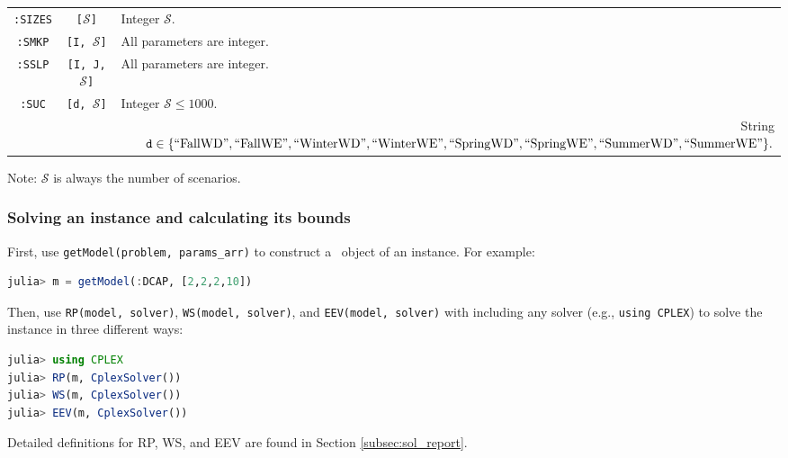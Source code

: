 \begin{table}[H]
{\begin{threeparttable}
\begin{tabular}{@{}ccl@{}}
				\texttt{:SIZES}              & \texttt{[$\mathcal{S}$]}          & Integer $\mathcal{S}$.                                                                                   \\
				\texttt{:SMKP}               & \texttt{[I, $\mathcal{S}$]}       & All parameters are integer.                                                                                                                \\
				\texttt{:SSLP}               & \texttt{[I, J, $\mathcal{S}$]}    & All parameters are integer.                                                                                                                \\
				\texttt{:SUC}                & \texttt{[d, $\mathcal{S}$]}       & \multicolumn{1}{l}{Integer $\mathcal{S}\le 1000$.}                                             \\
				\multicolumn{1}{l}{}         & \multicolumn{1}{l}{}            & \multicolumn{1}{r}{String $\texttt{d}\in \{\mathrm{``FallWD"}, \mathrm{``FallWE"}, \mathrm{``WinterWD"}, \mathrm{``WinterWE"}, \mathrm{``SpringWD"}, \mathrm{``SpringWE"}, \mathrm{``SummerWD"}, \mathrm{``SummerWE"} \}.$}\\				
				\bottomrule
			\end{tabular}
			\begin{tablenotes}
				\item Note: $\mathcal{S}$ is always the number of scenarios.
			\end{tablenotes}
		\end{threeparttable}
	}
\end{table}

\subsubsection{Solving an instance and calculating its bounds}
First, use \texttt{getModel(problem, params\_arr)} to construct a \jumpmodel\ object of an instance. For example:
\begin{lstlisting}[frame=single,language=julia]
julia> m = getModel(:DCAP, [2,2,2,10])
\end{lstlisting}
Then, use \texttt{RP(model, solver)}, \texttt{WS(model, solver)}, and \texttt{EEV(model, solver)} with including any solver (e.g., \texttt{using CPLEX}) to solve the instance in three different ways:
\begin{lstlisting}[frame=single,language=julia]
julia> using CPLEX
julia> RP(m, CplexSolver())
julia> WS(m, CplexSolver())
julia> EEV(m, CplexSolver())
\end{lstlisting}
Detailed definitions for RP, WS, and EEV are found in Section \ref{subsec:sol_report}.

